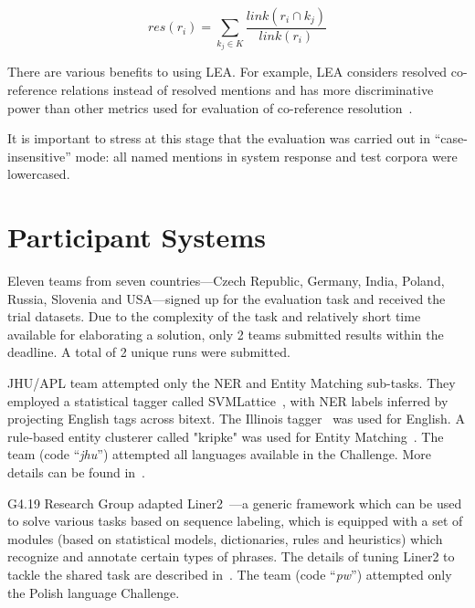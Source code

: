 \documentclass[11pt]{article}
\newcommand{\comment}[1]{}
\begin{document}
\begin{equation*}
	\mathit{res}(r_i) = \sum_{k_{j} \in K} \frac{\mathit{link}(r_{i} \cap k_{j})}{\mathit{link}(r_{i})}
\end{equation*}

There are various benefits to using LEA.  For example, LEA considers
resolved co-reference relations instead of resolved mentions and has more
discriminative power than other metrics used for evaluation of
co-reference resolution~\cite{DBLP:conf-acl-Moosavi016}.

It is important to stress at this stage that the evaluation was carried
out in ``case-insensitive'' mode: all named mentions in system response
and test corpora were lowercased.


\section{Participant Systems}
\label{sec:participants}
 
Eleven teams from seven countries---Czech Republic, Germany, India,
Poland, Russia, Slovenia and USA---signed up for the evaluation task and
received the trial datasets.  Due to the complexity of the task and
relatively short time available for elaborating a solution, only 2
teams submitted results within the deadline. A total of 2 unique runs 
were submitted.

JHU/APL team attempted only the NER and Entity Matching sub-tasks.  They
employed a statistical tagger called
SVMLattice~\cite{Mayfield:2003:LTU:956863.956921}, with NER labels
inferred by projecting English tags across bitext.  The Illinois
tagger~\cite{Ratinov:2009:DCM:1596374.1596399} was used for English. A
rule-based entity clusterer called "kripke" was used for Entity
Matching~\cite{DBLP:conf/tac/McNameeMFL13}.  
%
The team (code ``{\em jhu}'') attempted all languages available in the
Challenge. More details can be found in~\cite{mayfield:2017}.

{\sc G4.19 Research Group} adapted
Liner2~\cite{series/sci/MarcinczukKJ13}---a generic framework which can
be used to solve various tasks based on sequence labeling, which is
equipped with a set of modules (based on statistical models,
dictionaries, rules and heuristics) which recognize and annotate certain
types of phrases.  The details of tuning Liner2 to tackle the shared task
are described in~\cite{marcinczuk:2017}.
%
The team (code ``{\em pw}'') attempted only the Polish language Challenge.

\comment{
The {\sc DeepNLP} team\footnote{\tt https://github.com/tindzk/bsnlp}
learns entities and their base forms from Wikipedia data
dumps.\footnote{\tt https://dumps.wikimedia.org/} A character-level
recurrent neural network~\cite{DBLP:conf/aaai/KimJSR16} is trained to
predict which characters belong to an entity. A second neural network is
trained on inflected entities and predicts their base forms.
}
\end{document}
